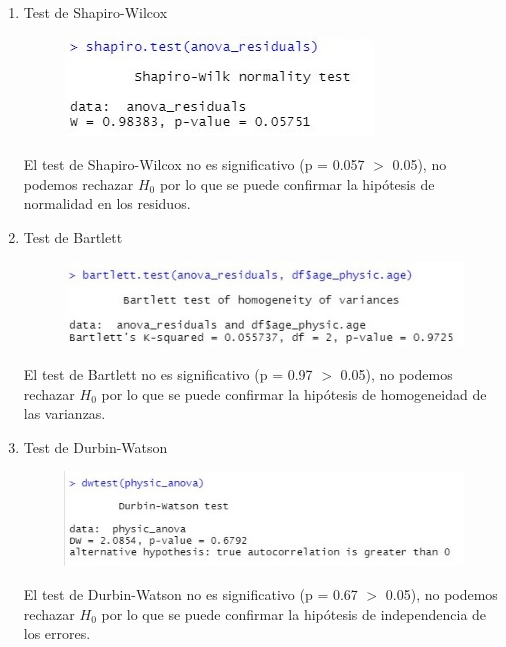 \documentclass[a4paper,10pt,twocolumn]{article}
\begin{document}
\begin{enumerate}
	\item Test de Shapiro-Wilcox
	
	\begin{figure}[h]
		\includegraphics[scale=0.7]{./imgs/anova_shapiro.jpg}
	\end{figure}
	
	El test de Shapiro-Wilcox no es significativo (p = 0.057 $>$ 0.05), no podemos rechazar $H_{0}$ por lo que se puede confirmar la hipótesis de normalidad en los residuos.
	
	\item Test de Bartlett
	
	\begin{figure}[h]
		\includegraphics[scale=0.7]{./imgs/anova_bartlett.jpg}
	\end{figure}
	
	El test de Bartlett no es significativo (p = 0.97 $>$ 0.05), no podemos rechazar $H_{0}$ por lo que se puede confirmar la hipótesis de homogeneidad de las varianzas.
	
	\item Test de Durbin-Watson
	
	\begin{figure}[h]
		\includegraphics[scale=0.63]{./imgs/anova_dw.jpg}
	\end{figure}
	
	El test de Durbin-Watson no es significativo (p = 0.67 $>$ 0.05), no podemos rechazar $H_{0}$ por lo que se puede confirmar la hipótesis de independencia de los errores.
	
\end{enumerate}
\end{document}
